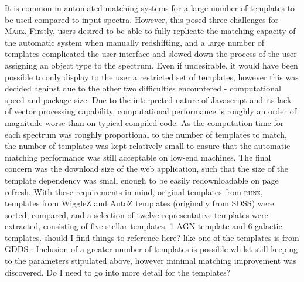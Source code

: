 \documentclass[iop]{emulateapj}
\newcommand{\green}{\color{LimeGreen}}
\newcommand{\runz}{\textsc{runz}}
\newcommand{\marz}{\textsc{Marz}}
\begin{document}
It is common in automated matching systems for a large number of templates to be used compared to input spectra. However, this posed three challenges for \marz{}. Firstly, users desired to be able to fully replicate the matching capacity of the automatic system when manually redshifting, and a large number of templates complicated the user interface and slowed down the process of the user assigning an object type to the spectrum. Even if undesirable, it would have been possible to only display to the user a restricted set of templates, however this was decided against due to the other two difficulties encountered - computational speed and package size. Due to the interpreted nature of Javascript and its lack of vector processing capability, computational performance is roughly an order of magnitude worse than on typical compiled code. As the computation time for each spectrum was roughly proportional to the number of templates to match, the number of templates was kept relatively small to ensure that the automatic matching performance was still acceptable on low-end machines. The final concern was the download size of the web application, such that the size of the template dependency was small enough to be easily redownloadable on page refresh. With these requirements in mind, original templates from \runz{}, templates from WiggleZ and AutoZ templates (originally from SDSS) were sorted, compared, and a selection of twelve representative templates were extracted, consisting of five stellar templates, 1 AGN template and 6 galactic templates. {\green should I find things to reference here? like one of the templates is from GDDS \cite{abraham2004}}. Inclusion of a greater number of templates is possible whilst still keeping to the parameters stipulated above, however minimal matching improvement was discovered. {\green Do I need to go into more detail for the templates?}
\end{document}

